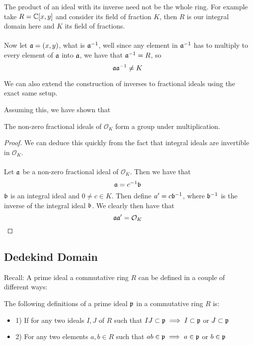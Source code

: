 \begin{example}
The product of an ideal with its inverse need not be the whole ring. For example take $R = \mathbb{C}[x, y]$ and consider its field of fraction $K$, then $R$ is our integral domain here and $K$ its field of fractions.\\\\
Now let $\mathfrak{a} = (x, y)$, what is $\mathfrak{a}^{-1}$, well since any element in $\mathfrak{a}^{-1}$ has to multiply to every element of $\mathfrak{a}$ into $\mathfrak{a}$, we have that $\mathfrak{a}^{-1} = R$, so
\[\mathfrak{a} \mathfrak{a}^{-1} \neq K\]
\end{example}

\begin{remark}
We can also extend the construction of inverses to fractional ideals using the exact same setup.
\end{remark}

\noindent Assuming this, we have shown that

\begin{theorem}[pg. 109 of S + T]
The non-zero fractional ideals of $\mathcal{O}_K$ form a group under multiplication.
\end{theorem}

\begin{proof}
We can deduce this quickly from the fact that integral ideals are invertible in $\mathcal{O}_K$.\\\\
Let $\mathfrak{a}$ be a non-zero fractional ideal of $\mathcal{O}_K$. Then we have that
\[\mathfrak{a} = c^{-1} \mathfrak{b}\]
$\mathfrak{b}$ is an integral ideal and $0 \neq c \in K$. Then define $a^\prime = c \mathfrak{b}^{-1}$, where $\mathfrak{b}^{-1}$ is the inverse of the integral ideal $\mathfrak{b}$. We clearly then have that
\[\mathfrak{a} \mathfrak{a}^\prime = \mathcal{O}_K\]
\end{proof}

\subsection{Dedekind Domain}

Recall: A prime ideal a commutative ring $R$ can be defined in a couple of different ways:

\begin{proposition}
The following definitions of a prime ideal $\mathfrak{p}$ in a commutative ring $R$ is:
\begin{itemize}
    \item 1) If for any two ideals $I, J$ of $R$ such that $IJ \subset \mathfrak{p} \implies I \subset \mathfrak{p}$ or $J \subset \mathfrak{p}$
    \item 2) For any two elements $a, b \in R$ such that $ab \in \mathfrak{p} \implies a \in \mathfrak{p}$ or $b \in \mathfrak{p}$
\end{itemize}
\end{proposition}


